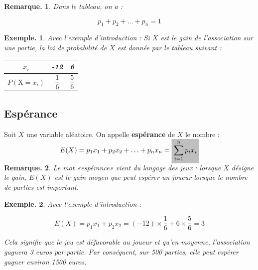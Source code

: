 \documentclass[12pt]{article}
\theoremstyle{break}
\newtheorem*{example}{Exemple.}
\newtheorem*{remark}{Remarque.}
\begin{document}
\begin{remark}
  Dans le tableau, on a :

  $$
  p_{1}+p_{2}+\ldots+p_{n}=1
  $$
\end{remark}

\begin{example}
  Avec l'exemple d'introduction : Si $X$ est le gain de l'association sur une partie, la loi de probabilité de $X$ est donnée par le tableau suivant :

  \begin{center}
  \renewcommand{\arraystretch}{2}
    \begin{tabular}{|c|c|c|}
      \hline
      $x_{i}$ & -12 & 6 \\
      \hline
      $P\left(\mathrm{X}=x_{i}\right)$ & $\dfrac{1}{6}$ & $\dfrac{5}{6}$ \\
      \hline
    \end{tabular}
  \end{center}
\end{example}

\subsection{Espérance}
\begin{definition}{}{}
  Soit $X$ une variable aléatoire. On appelle \textbf{espérance} de $X$ le nombre :

  $$
  E(X)=p_{1} x_{1}+p_{2} x_{2}+\ldots+p_{n} x_{n}=\hideM{\sum_{i=1}^{n} p_{i} x_{i}}
  $$
\end{definition}

\begin{remark}
  Le mot «espérance» vient du langage des jeux : lorsque $X$ désigne le gain, $E(X)$ est le gain moyen que peut espérer un joueur lorsque le nombre de parties est important.
\end{remark}

\begin{example}
  Avec l'exemple d'introduction :

  $$
  E(X)=p_{1} x_{1}+p_{2} x_{2}=(-12) \times \frac{1}{6}+6 \times \frac{5}{6}=3
  $$

  Cela signifie que le jeu est défavorable au joueur et qu'en moyenne, l'association gagnera 3 euros par partie. Par conséquent, sur 500 parties, elle peut espérer gagner environ 1500 euros.
\end{example}
\end{document}
